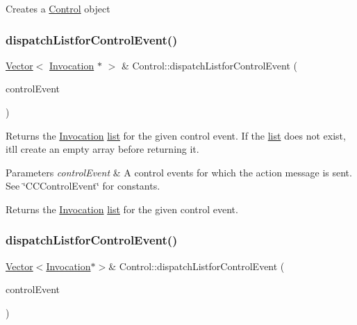 Creates a \hyperlink{classControl}{Control} object \mbox{\label{classControl_a95705570ef1f7fe00be96c0fe213fb6e}} 
\subsubsection{\texorpdfstring{dispatch\+Listfor\+Control\+Event()}{dispatchListforControlEvent()}\hspace{0.1cm}{\footnotesize\ttfamily [1/2]}}
{\footnotesize\ttfamily \hyperlink{classVector}{Vector}$<$ \hyperlink{classInvocation}{Invocation} $\ast$ $>$ \& Control\+::dispatch\+Listfor\+Control\+Event (\begin{DoxyParamCaption}\item[{Event\+Type}]{control\+Event }\end{DoxyParamCaption})\hspace{0.3cm}{\ttfamily [protected]}}

Returns the \hyperlink{classInvocation}{Invocation} \hyperlink{protocollist-p}{list} for the given control event. If the \hyperlink{protocollist-p}{list} does not exist, it\textquotesingle{}ll create an empty array before returning it.


\begin{DoxyParams}{Parameters}
{\em control\+Event} & A control events for which the action message is sent. See \char`\"{}\+C\+C\+Control\+Event\char`\"{} for constants.\\
\hline
\end{DoxyParams}
\begin{DoxyReturn}{Returns}
the \hyperlink{classInvocation}{Invocation} \hyperlink{protocollist-p}{list} for the given control event. 
\end{DoxyReturn}
\mbox{\label{classControl_af4f74a6a0db957e71a1718aa8513c2ae}} 
\subsubsection{\texorpdfstring{dispatch\+Listfor\+Control\+Event()}{dispatchListforControlEvent()}\hspace{0.1cm}{\footnotesize\ttfamily [2/2]}}
{\footnotesize\ttfamily \hyperlink{classVector}{Vector}$<$\hyperlink{classInvocation}{Invocation}$\ast$$>$\& Control\+::dispatch\+Listfor\+Control\+Event (\begin{DoxyParamCaption}\item[{Event\+Type}]{control\+Event }\end{DoxyParamCaption})\hspace{0.3cm}{\ttfamily [protected]}}

